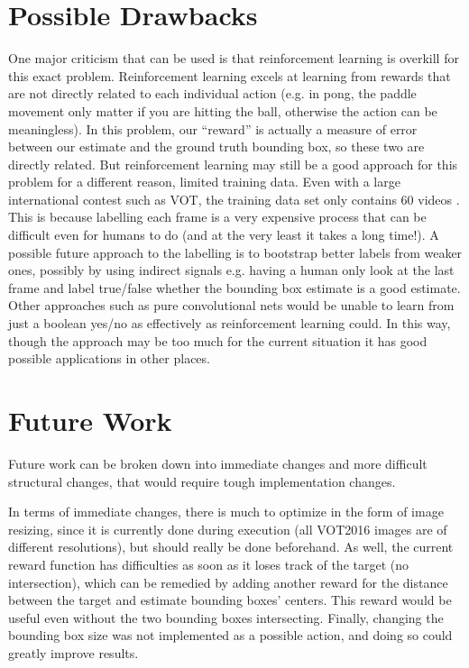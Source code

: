 \documentclass[letterpaper,12pt,titlepage,oneside,final]{book}
\begin{document}
\section{Possible Drawbacks}
One major criticism that can be used is that reinforcement learning is overkill for this exact problem. Reinforcement learning excels at learning from rewards that are not directly related to each individual action (e.g. in pong, the paddle movement only matter if you are hitting the ball, otherwise the action can be meaningless). In this problem, our ``reward'' is actually a measure of error between our estimate and the ground truth bounding box, so these two are directly related. But reinforcement learning may still be a good approach for this problem for a different reason, limited training data. Even with a large international contest such as VOT, the training data set only contains 60 videos \cite{vot2015}. This is because labelling each frame is a very expensive process that can be difficult even for humans to do (and at the very least it takes a long time!). A possible future approach to the labelling is to bootstrap better labels from weaker ones, possibly by using indirect signals e.g. having a human only look at the last frame and label true/false whether the bounding box estimate is a good estimate. Other approaches such as pure convolutional nets would be unable to learn from just a boolean yes/no as effectively as reinforcement learning could. In this way, though the approach may be too much for the current situation it has good possible applications in other places.

\section{Future Work}
Future work can be broken down into immediate changes and more difficult structural changes, that would require tough implementation changes.

In terms of immediate changes, there is much to optimize in the form of image resizing, since it is currently done during execution (all VOT2016 images are of different resolutions), but should really be done beforehand. As well, the current reward function has difficulties as soon as it loses track of the target (no intersection), which can be remedied by adding another reward for the distance between the target and estimate bounding boxes' centers. This reward would be useful even without the two bounding boxes intersecting. Finally, changing the bounding box size was not implemented as a possible action, and doing so could greatly improve results.
\end{document}
